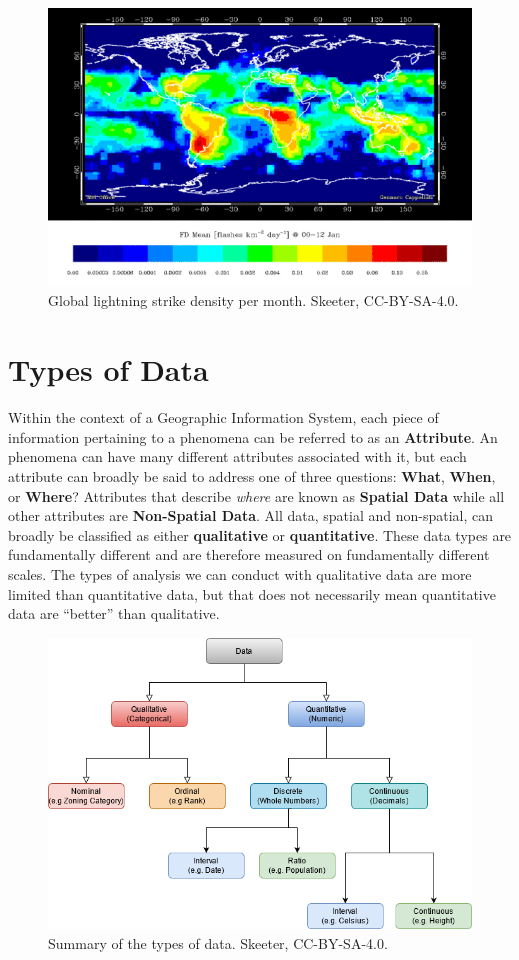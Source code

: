 \documentclass[
]{book}
\begin{document}
\begin{figure}
\includegraphics[width=0.75\linewidth]{images/03-lightning-density-static} \caption{Global lightning strike density per month. Skeeter, CC-BY-SA-4.0.}\label{fig:3-lightning-density}
\end{figure}

\section{Types of Data}\label{types-of-data-1}

Within the context of a Geographic Information System, each piece of information pertaining to a phenomena can be referred to as an \textbf{Attribute}. An phenomena can have many different attributes associated with it, but each attribute can broadly be said to address one of three questions: \textbf{What}, \textbf{When}, or \textbf{Where}? Attributes that describe \emph{where} are known as \textbf{Spatial Data} while all other attributes are \textbf{Non-Spatial Data}. All data, spatial and non-spatial, can broadly be classified as either \textbf{qualitative} or \textbf{quantitative}. These data types are fundamentally different and are therefore measured on fundamentally different scales. The types of analysis we can conduct with qualitative data are more limited than quantitative data, but that does not necessarily mean quantitative data are ``better'' than qualitative.

\begin{figure}
\includegraphics[width=0.75\linewidth]{images/03-data-types} \caption{Summary of the types of data. Skeeter, CC-BY-SA-4.0.}\label{fig:3-data-types}
\end{figure}
\end{document}
